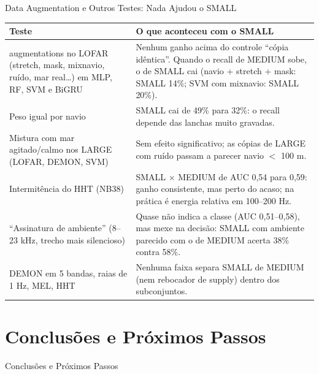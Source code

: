 \documentclass[aspectratio=169]{beamer}
\begin{document}
\begin{frame}{Data Augmentation e Outros Testes: Nada Ajudou o SMALL}
    \scriptsize
    \centering
    \setlength{\tabcolsep}{4pt}
    \begin{tabularx}{0.97\textwidth}{@{}>{\raggedright\arraybackslash}p{3.9cm}>{\raggedright\arraybackslash}X@{}}
        \toprule
        Teste & O que aconteceu com o SMALL \\
        \midrule
        7 augmentations no LOFAR (stretch, mask, mixnavio, ruído, mar real\ldots) em MLP, RF, SVM e BiGRU & Nenhum ganho acima do controle ``cópia idêntica''. Quando o recall de MEDIUM sobe, o de SMALL cai (navio + stretch + mask: SMALL 14\%; SVM com mixnavio: SMALL 20\%). \\
        Peso igual por navio & SMALL cai de 49\% para 32\%: o recall depende das lanchas muito gravadas. \\
        Mistura com mar agitado/calmo nos LARGE (LOFAR, DEMON, SVM) & Sem efeito significativo; as cópias de LARGE com ruído passam a parecer navio $<$ 100 m. \\
        Intermitência do HHT (NB38) & SMALL $\times$ MEDIUM de AUC 0,54 para 0,59: ganho consistente, mas perto do acaso; na prática é energia relativa em 100--200 Hz. \\
        ``Assinatura de ambiente'' (8--23 kHz, trecho mais silencioso) & Quase não indica a classe (AUC 0,51--0,58), mas mexe na decisão: SMALL com ambiente parecido com o de MEDIUM acerta 38\% contra 58\%. \\
        DEMON em 5 bandas, raias de 1 Hz, MEL, HHT & Nenhuma faixa separa SMALL de MEDIUM (nem rebocador de supply) dentro dos subconjuntos. \\
        \bottomrule
    \end{tabularx}
\end{frame}

\section{Conclusões e Próximos Passos}

\begin{frame}
    \centering
    \huge Conclusões e Próximos Passos
\end{frame}
\end{document}
